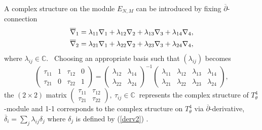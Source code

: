 \documentclass[12pt, a4paper]{article}
\newcommand{\C}{{\mathbb C}}
\begin{document}
A complex structure on the module $E_{N,M}$ can be introduced by
fixing $ \overline{\partial}$-connection
\begin{align} \label{holconn}
\overline{\nabla}_1 & = \lambda_{11} \nabla_1 + \lambda_{12}
\nabla_2 + \lambda_{13} \nabla_3 + \lambda_{14} \nabla_4 , \notag \\
 \overline{\nabla}_2 & = \lambda_{21} \nabla_1 + \lambda_{22}
\nabla_2 + \lambda_{23} \nabla_3 + \lambda_{24} \nabla_4 , \notag
\end{align}
where $\lambda_{ij} \in \C .$ \ Choosing an appropriate basis such
that $(\lambda_{ij})$ becomes
\begin{equation*}
\begin{pmatrix} \tau_{11} & 1 & \tau_{12} & 0 \\
          \tau_{21} & 0 & \tau_{22} & 1 \end{pmatrix}
                   =  \begin{pmatrix} \lambda_{12} & \lambda_{14} \\
            \lambda_{22} & \lambda_{24} \end{pmatrix}^{-1}
            \begin{pmatrix}
           \lambda_{11}& \lambda_{12} &
             \lambda_{13} & \lambda_{14} \\
           \lambda_{21} & \lambda_{22} &
           \lambda_{23} & \lambda_{24}
            \end{pmatrix} ,
\end{equation*}
 the $(2 \times 2) $  matrix $\begin{pmatrix} \tau_{11} & \tau_{12}  \\
          \tau_{21}  & \tau_{22}  \end{pmatrix}, \ \tau_{ij} \in \C \ $ represents
          the complex structure of $ T_\theta^4$-module and 1-1 corresponds to
          the complex structure on $ T_\theta^4  $ via $\overline{\partial}$-derivative,
           $ \overline{\delta}_i = \sum_j \lambda_{ij} \delta_j $ where $\delta_j$ is
           defined by (\ref{derv2}) \cite{schwarz01}.
\end{document}
